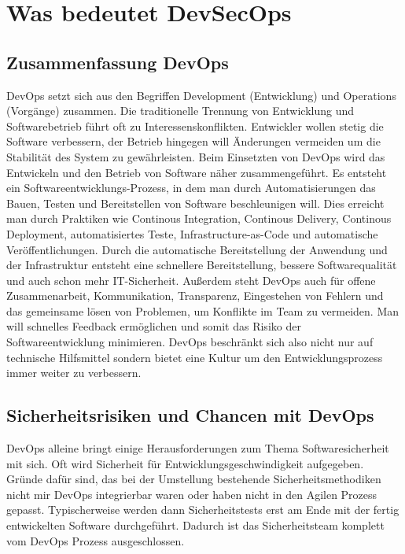 \chapter{Was bedeutet DevSecOps}

\section{Zusammenfassung DevOps}
DevOps setzt sich aus den Begriffen \glqq Development \grqq{}(Entwicklung) und \glqq Operations \grqq{}(Vorgänge) zusammen. Die traditionelle Trennung von Entwicklung und Softwarebetrieb führt oft zu Interessenskonflikten. Entwickler wollen stetig die Software verbessern, der Betrieb hingegen will Änderungen vermeiden um die Stabilität des System zu gewährleisten. \cite{git-ops} Beim Einsetzten von  DevOps wird das Entwickeln und den Betrieb von Software näher zusammengeführt. Es entsteht ein Softwareentwicklungs-Prozess, in dem man durch Automatisierungen das Bauen, Testen und Bereitstellen von Software beschleunigen will. Dies erreicht man durch Praktiken wie Continous Integration, Continous Delivery, Continous Deployment, automatisiertes Teste, Infrastructure-as-Code und automatische Veröffentlichungen. Durch die automatische Bereitstellung der Anwendung und der Infrastruktur entsteht eine schnellere Bereitstellung, bessere Softwarequalität und auch schon mehr IT-Sicherheit. \cite{dev-ops} Außerdem steht DevOps auch für offene Zusammenarbeit, Kommunikation, Transparenz, Eingestehen von Fehlern und das gemeinsame lösen von Problemen, um Konflikte im Team zu vermeiden. Man will schnelles Feedback ermöglichen und somit das Risiko der Softwareentwicklung minimieren. DevOps beschränkt sich also nicht nur auf technische Hilfsmittel sondern bietet eine Kultur um den Entwicklungsprozess immer weiter zu verbessern.\cite{git-ops}

\section{Sicherheitsrisiken und Chancen mit DevOps}
DevOps alleine bringt einige Herausforderungen zum Thema Softwaresicherheit mit sich. Oft wird Sicherheit für Entwicklungsgeschwindigkeit aufgegeben. Gründe dafür sind, das bei der Umstellung bestehende Sicherheitsmethodiken nicht mir DevOps integrierbar waren oder haben nicht in den Agilen Prozess gepasst.
Typischerweise werden dann Sicherheitstests erst am Ende mit der fertig entwickelten Software durchgeführt. Dadurch ist das Sicherheitsteam komplett vom DevOps Prozess ausgeschlossen.

